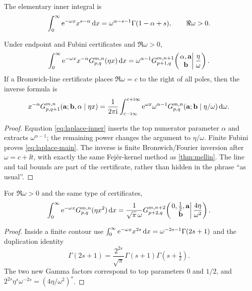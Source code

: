 The elementary inner integral is
\begin{equation}\label{eq:laplace-inner}
 \int_0^\infty \mathrm e^{-\omega x}x^{s-\alpha}\,\mathrm d x
 =\omega^{\alpha-s-1}\Gamma(1-\alpha+s),
 \qquad \Re\omega>0.
\end{equation}

\begin{theorem}\label{thm:laplace}
Under endpoint and Fubini certificates and $\Re\omega>0$,
\begin{equation}\label{eq:laplace-main}
\int_0^\infty \mathrm e^{-\omega x}x^{-\alpha}G_{p,q}^{m,n}(\eta x)\,\mathrm d x
=\omega^{\alpha-1}
G_{p+1,q}^{m,n+1}\!\left(
 \left.\begin{matrix}\alpha,\mathbf a\\\mathbf b\end{matrix}\right|
 \frac\eta\omega\right).
\end{equation}
If a Bromwich-line certificate places $\Re\omega=c$ to the right of all poles,
then the inverse formula is
\begin{equation}\label{eq:inverse-laplace}
 x^{-\alpha}G_{p,q+1}^{m,n}(\mathbf a;\mathbf b,\alpha\mid\eta x)
 =\frac1{2\pi\mathrm i}\int_{c-\mathrm i\infty}^{c+\mathrm i\infty}
 \mathrm e^{\omega x}\omega^{\alpha-1}
 G_{p,q}^{m,n}(\mathbf a;\mathbf b\mid\eta/\omega)\,\mathrm d\omega.
\end{equation}
\end{theorem}
\begin{proof}
Equation \eqref{eq:laplace-inner} inserts the top numerator parameter $\alpha$
and extracts $\omega^{\alpha-1}$; the remaining power changes the argument to
$\eta/\omega$.  Finite Fubini proves \eqref{eq:laplace-main}.  The inverse is
finite Bromwich/Fourier inversion after $\omega=c+\ii t$, with exactly the same
Fej\'er-kernel method as \cref{thm:mellin}.  The line and tail bounds are part
of the certificate, rather than hidden in the phrase ``as usual''.
\end{proof}

\begin{theorem}\label{thm:quadratic-laplace}
For $\Re\omega>0$ and the same type of certificates,
\begin{equation}\label{eq:quadratic-laplace}
 \int_0^\infty \mathrm e^{-\omega x}G_{p,q}^{m,n}(\eta x^2)\,\mathrm d x
 =\frac1{\sqrt\pi\,\omega}
 G_{p+2,q}^{m,n+2}\!\left(
 \left.\begin{matrix}0,\frac12,\mathbf a\\\mathbf b\end{matrix}\right|
 \frac{4\eta}{\omega^2}\right).
\end{equation}
\end{theorem}
\begin{proof}
Inside a finite contour use
$\int_0^\infty\mathrm e^{-\omega x}x^{2s}\,\mathrm d x=
\omega^{-2s-1}\Gamma(2s+1)$ and the duplication identity
\[
 \Gamma(2s+1)=\frac{2^{2s}}{\sqrt\pi}\Gamma(s+1)\Gamma(s+\tfrac12).
\]
The two new Gamma factors correspond to top parameters $0$ and $1/2$, and
$2^{2s}\eta^s\omega^{-2s}=(4\eta/\omega^2)^s$.
\end{proof}

